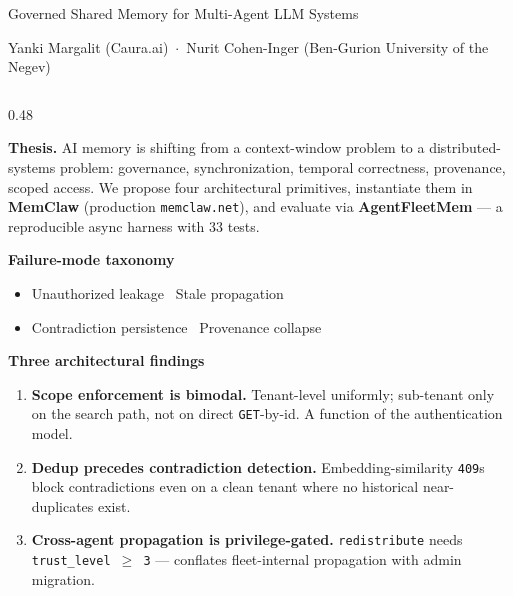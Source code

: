 \documentclass[10pt,aspectratio=169]{beamer}
\begin{document}
\begin{frame}{Governed Shared Memory for Multi-Agent LLM Systems}

\footnotesize

{\scriptsize
Yanki Margalit (Caura.ai) \,$\cdot$\,
Nurit Cohen-Inger (Ben-Gurion University of the Negev)
}

\vspace{0.4em}

\begin{columns}[T,onlytextwidth]

\begin{column}{0.48\textwidth}

\textbf{Thesis.} AI memory is shifting from a context-window problem to a
distributed-systems problem: governance, synchronization, temporal
correctness, provenance, scoped access. We propose four architectural
primitives, instantiate them in \textbf{MemClaw} (production
\texttt{memclaw.net}), and evaluate via \textbf{AgentFleetMem} --- a
reproducible async harness with 33 tests.

\vspace{0.4em}

\textbf{Failure-mode taxonomy}
\begin{itemize}\setlength\itemsep{0.05em}\setlength\parskip{0pt}
  \item Unauthorized leakage \quad \textbullet\ Stale propagation
  \item Contradiction persistence \quad \textbullet\ Provenance collapse
\end{itemize}

\vspace{0.3em}

\textbf{Three architectural findings}
\begin{enumerate}\setlength\itemsep{0.15em}\setlength\parskip{0pt}
  \item \textcolor{warn}{\textbf{Scope enforcement is bimodal.}}
        Tenant-level uniformly; sub-tenant only on the search path,
        not on direct \texttt{GET}-by-id. A function of the
        authentication model.
  \item \textcolor{warn}{\textbf{Dedup precedes contradiction detection.}}
        Embedding-similarity \texttt{409}s block contradictions even on
        a clean tenant where no historical near-duplicates exist.
  \item \textcolor{warn}{\textbf{Cross-agent propagation is privilege-gated.}}
        \texttt{redistribute} needs \texttt{trust\_level $\ge$ 3} ---
        conflates fleet-internal propagation with admin migration.
\end{enumerate}


\end{column}
\end{columns}
\end{frame}
\end{document}
